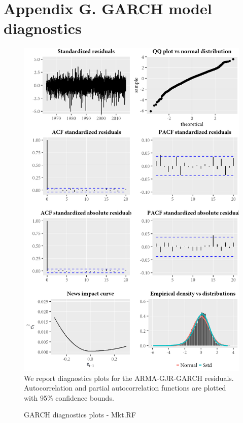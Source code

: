 \section{Appendix G. GARCH model diagnostics}
\label{App:AppendixG}
\begin{figure}[H]
  \caption{GARCH diagnostics plots - Mkt.RF}
  \label{diag:garchdiagMkt.RF}
  \toprule
  \centering
  \begin{minipage}{\textwidth}
  \includegraphics[scale=1]{graphics/garch/garch_diagnosticsMkt.RF.png}  
  \bottomrule
  \vspace{3mm}
  \footnotesize
  We report diagnostics plots for the ARMA-GJR-GARCH residuals. Autocorrelation and partial autocorrelation functions are plotted with 95\% confidence bounds.
  \end{minipage}
\end{figure}
